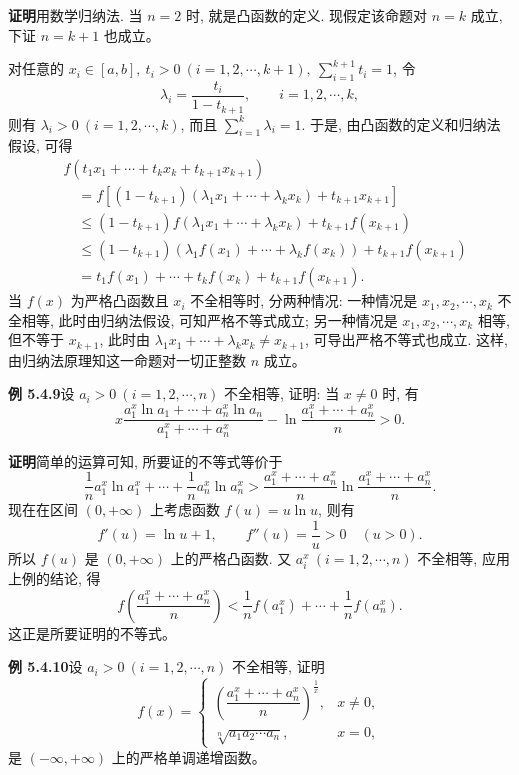 \documentclass[UTF8,12pt,a4paper,fontset=fandol]{ctexart}
\begin{document}
\noindent\textbf{证明}\quad 用数学归纳法. 当 $n=2$ 时, 就是凸函数的定义. 现假定该命题对 $n=k$ 成立, 下证 $n=k+1$ 也成立。

对任意的 $x_i\in[a,b],\ t_i>0\ (i=1,2,\cdots,k+1),\ \sum_{i=1}^{k+1}t_i=1$, 令
\[
  \lambda_i=\frac{t_i}{1-t_{k+1}},\qquad i=1,2,\cdots,k,
\]
则有 $\lambda_i>0\ (i=1,2,\cdots,k)$, 而且 $\sum_{i=1}^k\lambda_i=1$. 于是, 由凸函数的定义和归纳法假设, 可得
\[
\begin{aligned}
  &f(t_1x_1+\cdots+t_kx_k+t_{k+1}x_{k+1})\\
  &\quad=f[(1-t_{k+1})(\lambda_1x_1+\cdots+\lambda_kx_k)+t_{k+1}x_{k+1}]\\
  &\quad\leqslant(1-t_{k+1})f(\lambda_1x_1+\cdots+\lambda_kx_k)+t_{k+1}f(x_{k+1})\\
  &\quad\leqslant(1-t_{k+1})(\lambda_1f(x_1)+\cdots+\lambda_kf(x_k))+t_{k+1}f(x_{k+1})\\
  &\quad=t_1f(x_1)+\cdots+t_kf(x_k)+t_{k+1}f(x_{k+1}).
\end{aligned}
\]
当 $f(x)$ 为严格凸函数且 $x_i$ 不全相等时, 分两种情况: 一种情况是 $x_1,x_2,\cdots,x_k$ 不全相等, 此时由归纳法假设, 可知严格不等式成立; 另一种情况是 $x_1,x_2,\cdots,x_k$ 相等, 但不等于 $x_{k+1}$, 此时由 $\lambda_1x_1+\cdots+\lambda_kx_k\ne x_{k+1}$, 可导出严格不等式也成立. 这样, 由归纳法原理知这一命题对一切正整数 $n$ 成立。

\noindent\textbf{例 5.4.9}\quad 设 $a_i>0\ (i=1,2,\cdots,n)$ 不全相等, 证明: 当 $x\ne0$ 时, 有
\[
  x\frac{a_1^x\ln a_1+\cdots+a_n^x\ln a_n}{a_1^x+\cdots+a_n^x}
  -\ln\frac{a_1^x+\cdots+a_n^x}{n}>0.
\]

\noindent\textbf{证明}\quad 简单的运算可知, 所要证的不等式等价于
\[
  \frac1n a_1^x\ln a_1^x+\cdots+\frac1n a_n^x\ln a_n^x
  >\frac{a_1^x+\cdots+a_n^x}{n}\ln\frac{a_1^x+\cdots+a_n^x}{n}.
\]
现在在区间 $(0,+\infty)$ 上考虑函数 $f(u)=u\ln u$, 则有
\[
  f'(u)=\ln u+1,\qquad f''(u)=\frac1u>0\quad (u>0).
\]
所以 $f(u)$ 是 $(0,+\infty)$ 上的严格凸函数. 又 $a_i^x\ (i=1,2,\cdots,n)$ 不全相等, 应用上例的结论, 得
\[
  f\left(\frac{a_1^x+\cdots+a_n^x}{n}\right)
  <\frac1n f(a_1^x)+\cdots+\frac1n f(a_n^x).
\]
这正是所要证明的不等式。

\noindent\textbf{例 5.4.10}\quad 设 $a_i>0\ (i=1,2,\cdots,n)$ 不全相等, 证明
\[
  f(x)=
  \begin{cases}
    \left(\dfrac{a_1^x+\cdots+a_n^x}{n}\right)^{\frac1x}, & x\ne0,\\[6pt]
    \sqrt[n]{a_1a_2\cdots a_n}, & x=0,
  \end{cases}
\]
是 $(-\infty,+\infty)$ 上的严格单调递增函数。
\end{document}
